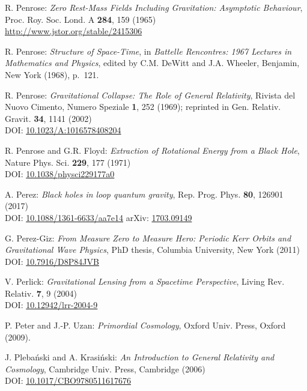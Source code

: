 \begin{thebibliography}{123}
R. Penrose:
{\em Zero Rest-Mass Fields Including Gravitation: Asymptotic Behaviour},
Proc. Roy. Soc. Lond. A {\bf 284}, 159 (1965)\\
\url{http://www.jstor.org/stable/2415306}

R. Penrose: {\em Structure of Space-Time},
in {\em Battelle Rencontres: 1967 Lectures in Mathematics and Physics},
edited by C.M. DeWitt and J.A. Wheeler,
Benjamin, New York (1968), p.~121.

R. Penrose: {\em Gravitational Collapse: The Role of General Relativity},
Rivista del Nuovo Cimento, Numero Speziale {\bf 1}, 252 (1969); reprinted in
Gen. Relativ. Gravit. {\bf 34}, 1141 (2002)\\
DOI: \href{https://doi.org/10.1023/A:1016578408204}{10.1023/A:1016578408204}

R. Penrose and G.R. Floyd: {\em Extraction of Rotational Energy from
a Black Hole},  Nature Phys. Sci. {\bf 229}, 177 (1971)\\
DOI: \href{https://doi.org/10.1038/physci229177a0}{10.1038/physci229177a0}

A. Perez:
{\em Black holes in loop quantum gravity},
Rep. Prog. Phys. {\bf 80}, 126901 (2017)\\
DOI: \href{https://doi.org/10.1088/1361-6633/aa7e14}{10.1088/1361-6633/aa7e14}\hfill
arXiv: \href{https://arxiv.org/abs/1703.09149}{1703.09149}

G. Perez-Giz: {\em From Measure Zero to Measure Hero:
Periodic Kerr Orbits and Gravitational Wave Physics},
PhD thesis, Columbia University, New York (2011)\\
DOI: \href{https://doi.org/10.7916/D8P84JVB}{10.7916/D8P84JVB}

V. Perlick:
{\em Gravitational Lensing from a Spacetime Perspective},
Living Rev. Relativ. {\bf 7}, 9 (2004)\\
DOI: \href{https://doi.org/10.12942/lrr-2004-9}{10.12942/lrr-2004-9}

P. Peter and J.-P. Uzan: {\em Primordial Cosmology},
Oxford Univ. Press, Oxford (2009).

J. Pleba\'nski and A. Krasi\'nski:
{\em An Introduction to General Relativity and Cosmology},
Cambridge Univ. Press, Cambridge (2006)\\
DOI: \href{https://doi.org/10.1017/CBO9780511617676}{10.1017/CBO9780511617676}


\end{thebibliography}
